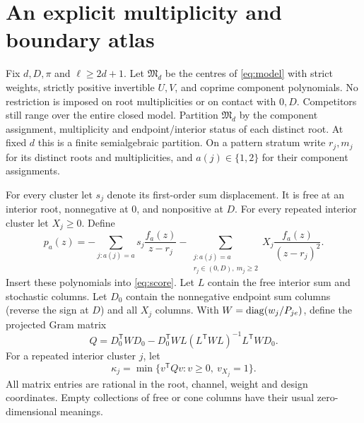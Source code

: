 \section{An explicit multiplicity and boundary atlas}\label{sec:multiplicity}
Fix $d,D,\pi$ and $\ell\ge2d+1$. Let $\mathfrak M_d$ be the centres of
\eqref{eq:model} with strict weights, strictly positive invertible $U,V$,
and coprime component polynomials. No restriction is imposed on root
multiplicities or on contact with $0,D$. Competitors still range over the
entire closed model. Partition $\mathfrak M_d$ by the component assignment,
multiplicity and endpoint/interior status of each distinct root. At fixed
$d$ this is a finite semialgebraic partition. On a pattern stratum write
$r_j,m_j$ for its distinct roots and multiplicities, and $a(j)\in\{1,2\}$
for their component assignments.

For every cluster let $s_j$ denote its first-order sum displacement.
It is free at an interior root, nonnegative at $0$, and nonpositive at
$D$. For every repeated interior cluster let $X_j\ge0$. Define
\begin{equation}\label{eq:mult-jet}
 p_a(z)=-\sum_{j:a(j)=a}s_j\frac{f_a(z)}{z-r_j}
        -\sum_{\substack{j:a(j)=a\\r_j\in(0,D),\ m_j\ge2}}
                     X_j\frac{f_a(z)}{(z-r_j)^2}.
\end{equation}
Insert these polynomials into \eqref{eq:score}. Let $L$ contain the free
interior sum and stochastic columns. Let $D_0$ contain the nonnegative
endpoint sum columns (reverse the sign at $D$) and all $X_j$ columns.
With $W=\operatorname{diag}(w_j/P_{je})$, define the projected Gram matrix
\begin{equation}\label{eq:mult-Q}
 Q=D_0^{\mathsf T}WD_0-D_0^{\mathsf T}WL
              (L^{\mathsf T}WL)^{-1}L^{\mathsf T}WD_0.
\end{equation}
For a repeated interior cluster $j$, let
\begin{equation}\label{eq:mult-kappa}
 \kappa_j=\min\{v^{\mathsf T}Qv:v\ge0,\ v_{X_j}=1\}.
\end{equation}
All matrix entries are rational in the root, channel, weight and design
coordinates. Empty collections of free or cone columns have their usual
zero-dimensional meanings.

